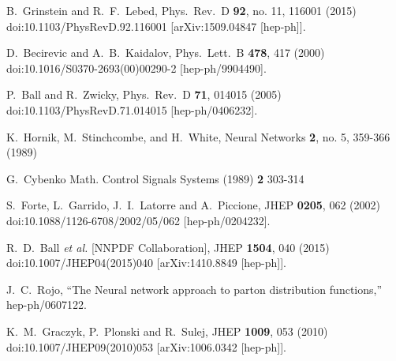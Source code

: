 \begin{thebibliography}{99}
  B.~Grinstein and R.~F.~Lebed,
  Phys.\ Rev.\ D {\bf 92}, no. 11, 116001 (2015)
  doi:10.1103/PhysRevD.92.116001
  [arXiv:1509.04847 [hep-ph]].
  
  D.~Becirevic and A.~B.~Kaidalov,
  Phys.\ Lett.\ B {\bf 478}, 417 (2000)
  doi:10.1016/S0370-2693(00)00290-2
  [hep-ph/9904490].
  
  P.~Ball and R.~Zwicky,
  Phys.\ Rev.\ D {\bf 71}, 014015 (2005)
  doi:10.1103/PhysRevD.71.014015
  [hep-ph/0406232].
  
  K.~Hornik, M.~Stinchcombe, and H.~White,
  Neural Networks {\bf 2}, no. 5, 359-366 (1989)

  G.~Cybenko
  Math. Control Signals Systems (1989) {\bf 2} 303-314
  
  S.~Forte, L.~Garrido, J.~I.~Latorre and A.~Piccione,
  JHEP {\bf 0205}, 062 (2002)
  doi:10.1088/1126-6708/2002/05/062
  [hep-ph/0204232].
  
  R.~D.~Ball {\it et al.} [NNPDF Collaboration],
  JHEP {\bf 1504}, 040 (2015)
  doi:10.1007/JHEP04(2015)040
  [arXiv:1410.8849 [hep-ph]].
  
  J.~C.~Rojo,
  ``The Neural network approach to parton distribution functions,''
  hep-ph/0607122.
  
  K.~M.~Graczyk, P.~Plonski and R.~Sulej,
  JHEP {\bf 1009}, 053 (2010)
  doi:10.1007/JHEP09(2010)053
  [arXiv:1006.0342 [hep-ph]].
  

\end{thebibliography}
